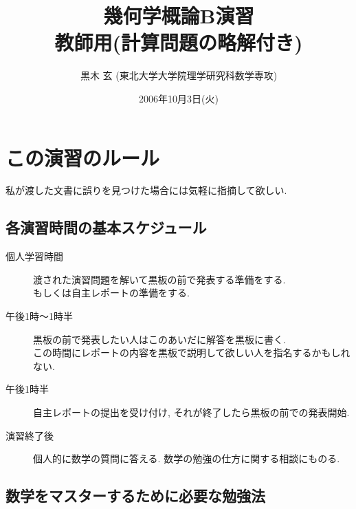 \documentclass[12pt,twoside]{jarticle}
\begin{document}

\title{\bf 幾何学概論B演習
  \ifx\STUDENT\undefined\\{\normalsize 教師用\quad(計算問題の略解付き)}\fi}

\author{黒木 玄 \quad (東北大学大学院理学研究科数学専攻)}

\date{2006年10月3日(火)}

\maketitle

\tableofcontents


\section{この演習のルール}


私が渡した文書に誤りを見つけた場合には気軽に指摘して欲しい.

\subsection{各演習時間の基本スケジュール}

\begin{description}
 \item[個人学習時間]
  渡された演習問題を解いて黒板の前で発表する準備をする. \\
  もしくは自主レポートの準備をする.
 \item[午後1時〜1時半] 
  黒板の前で発表したい人はこのあいだに解答を黒板に書く. \\
  この時間にレポートの内容を黒板で説明して欲しい人を指名するかもしれない.
 \item[午後1時半]
  自主レポートの提出を受け付け, それが終了したら黒板の前での発表開始.
 \item[演習終了後]
  個人的に数学の質問に答える. 
  数学の勉強の仕方に関する相談にものる.
\end{description}

\subsection{数学をマスターするために必要な勉強法}
\end{document}
